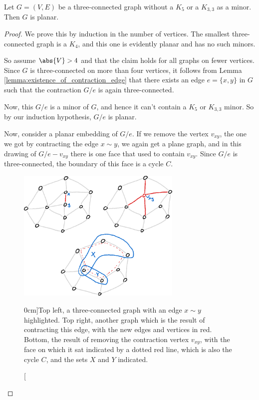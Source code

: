 \documentclass[nobib]{tufte-handout}
\begin{document}
\begin{lemma}
  Let $G = (V,E)$ be a three-connected graph without a $K_5$ or a $K_{3,3}$ as a minor. Then $G$ is planar.

  \begin{proof}
    We prove this by induction in the number of vertices. The smallest three-connected graph is a $K_4$, and this one is evidently planar and has no such minors.

    So assume $\abs{V} > 4$ and that the claim holds for all graphs on fewer vertices. Since $G$ is three-connected on more than four vertices, it follows from Lemma \ref{lemma:existence_of_contraction_edge} that there exists an edge $e = \{x,y\}$ in $G$ such that the contraction $G/e$ is again three-connected.

    Now, this $G/e$ is a minor of $G$, and hence it can't contain a $K_5$ or $K_{3,3}$ minor. So by our induction hypothesis, $G/e$ is planar.

    Now, consider a planar embedding of $G/e$. If we remove the vertex $v_{xy}$, the one we got by contracting the edge $x\sim y$, we again get a plane graph, and in this drawing of $G/e - v_{xy}$ there is one face that used to contain $v_{xy}$. Since $G/e$ is three-connected, the boundary of this face is a cycle $C$.

    \begin{figure}
      \centering
      \includegraphics[width=0.7\textwidth]{graphics/L11_planarity/wagner_kuratowski_proof.png}
      \caption[][0cm]{Top left, a three-connected graph with an edge $x\sim y$ highlighted. Top right, another graph which is the result of contracting this edge, with the new edges and vertices in red. Bottom, the result of removing the contraction vertex $v_{xy}$, with the face on which it sat indicated by a dotted red line, which is also the cycle $C$, and the sets $X$ and $Y$ indicated.}
      \label{fig:wagner_kuratowski}
    \end{figure}


\end{proof}
\end{lemma}
\end{document}
